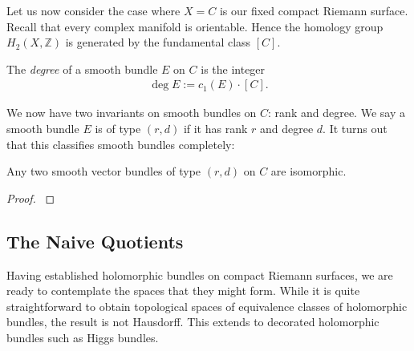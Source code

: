 \documentclass[12pt]{ociamthesis}  %
\begin{document}
Let us now consider the case where $X=C$ is our fixed compact Riemann surface.
Recall that every complex manifold is orientable. Hence the homology
group $H_2(X,\mathbb{Z})$ is generated by the fundamental class $[C]$.

\begin{definition}
  The \emph{degree} of a smooth bundle $E$ on $C$ is the integer
  \begin{align*}
    \deg E := c_1(E)\cdot[C].
  \end{align*}
\end{definition}

We now have two invariants on smooth bundles on $C$: rank and degree.
We say a smooth bundle $E$ is of type $(r,d)$ if it has rank $r$
and degree $d$. It turns out that this classifies smooth bundles
completely:

\begin{theorem}
  Any two smooth vector bundles of type $(r,d)$ on $C$
  are isomorphic.
  \begin{proof}
    \cite[Proposition 5.4]{neitzke2021}
    \missingproof
  \end{proof}
\end{theorem}

\subsection{The Naive Quotients}

Having established holomorphic bundles on compact Riemann surfaces,
we are ready to contemplate the spaces that they might form. While it is
quite straightforward to obtain topological spaces of equivalence
classes of holomorphic bundles, the result is not Hausdorff.
This extends to decorated holomorphic bundles such as Higgs bundles.
\end{document}
